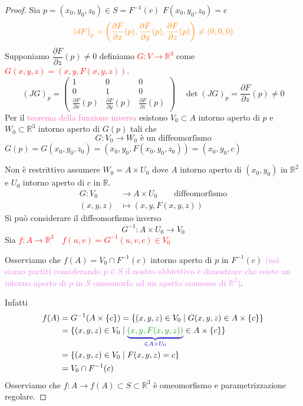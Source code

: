         \begin{proof}
        \mbox{}

        Sia $p= (x_0, y_0, z_0) \in S = F^{-1}(c)$ \textcolor{blu}{$F(x_0, y_0, z_0) = c$} 
        \[ \color{orange} \left(dF\right)_p = \left( \frac{\partial F}{\partial x}(p), \frac{\partial F}{\partial y}(p), \frac{\partial F}{\partial z}(p) \right) \neq (0,0,0) \]
        Supponiamo $\dfrac{\partial F}{\partial z}(p) \neq 0$ definiamo \textcolor{red}{$G \colon V \to \mathbb{R}^3$} come \textcolor{red}{$G(x,y,z) = (x,y,F(x,y,z))$}.
        \[ \left(J G\right)_p = 
        \begin{pmatrix}
        1 & 0 & 0 \\
        0 & 1 & 0 \\
        \frac{\partial F}{\partial x}(p) & \frac{\partial F}{\partial y}(p) & \frac{\partial F}{\partial z}(p)
        \end{pmatrix} \quad \det \left(J G\right)_p = \frac{\partial F}{\partial z}(p) \neq 0 \]
        Per il \textcolor{hotpink}{teorema della funzione inversa} esistono $V_0 \subset A$ intorno aperto di $p$ e $W_0 \subset \mathbb{R}^3$ intorno aperto di $G(p)$ tali che 
        \[ G \colon V_0 \to W_0 \text{ è un diffeomorfismo} \]
        $G(p)= G(x_0, y_0, z_0)=(x_0, y_0, F(x_0, y_0, z_0))=(x_0, y_0, c)$

        Non è restrittivo assumere $W_0 = A \times U_0$ dove $A$ intorno aperto di $(x_0, y_0)$ in $\mathbb{R}^2$
        e $U_0$ intorno aperto di $c$ in $\mathbb{R}$.
        \[
        \begin{aligned}
        G \colon V_0 & \longrightarrow A \times U_0 \qquad \text{diffeomorfismo} \\
        (x, y, z) & \longmapsto (x, y, F(x, y, z))
        \end{aligned}
        \]
        Si può considerare il diffeomorfismo inverso
        \[ G^{-1} \colon A \times U_0 \longrightarrow V_0 \]
        Sia \textcolor{red}{$f \colon A \to \mathbb{R}^3 \quad f(u,v)=G^{-1}(u,v,c) \in V_0$}

        Osserviamo che $f(A)= V_0 \cap F^{-1}(c)$ intorno aperto di $p$ in $F^{-1}(c)$ 
        \textcolor{violet}{(noi siamo partiti considerando $p \in S$ il nostro obbiettivo è 
        dimostrare che esiste un intorno aperto di $p$ in $S$ omeomorfo ad un aperto connesso di $\mathbb{R}^2$)}.

        Infatti 
        \[ \begin{aligned}
        f(A) &= G^{-1}(A \times \{c\} )= \{ (x,y,z) \in V_0 \mid G(x,y,z) \in A \times \{c\} \} \\
        &= \{ (x,y,z) \in V_0 \mid \textcolor{blu}{\underbrace{\textcolor{verde}{(x,y,F(x,y,z))}}_{\in A \times U_0}} \in A \times \{c\} \} \\
        &= \{ (x,y,z) \in V_0 \mid F(x,y,z) = c \} \\
        &= V_0 \cap F^{-1}(c)
        \end{aligned} \]
        Osserviamo che $f \colon A \to f(A) \subset S \subset \mathbb{R}^3$ è omeomorfismo e parametrizzazione regolare.


\end{proof}
